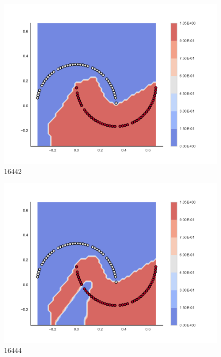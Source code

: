 \begin{subfigure}[b]{0.09\textwidth}
    \includegraphics[clip, trim=2.35cm 1.75cm 4.5cm 0cm,width=\textwidth]{img/convergence/16442.pdf}
    \caption{16442}
    \label{fig:convergence_16442}
\end{subfigure}
%
\begin{subfigure}[b]{0.09\textwidth}
    \includegraphics[clip, trim=2.35cm 1.75cm 4.5cm 0cm,width=\textwidth]{img/convergence/16444.pdf}
    \caption{16444}
    \label{fig:convergence_16444}
\end{subfigure}
%
